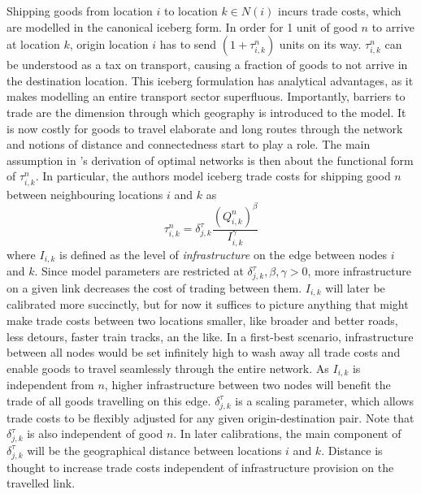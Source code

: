 \documentclass[11pt, oneside]{article}   	%
\begin{document}
Shipping goods from location $i$ to location $k \in N(i)$ incurs trade costs, which are modelled in the canonical iceberg form. In order for 1 unit of good $n$ to arrive at location $k$, origin location $i$ has to send $(1+\tau_{i,k}^{n})$ units on its way. $\tau_{i,k}^{n}$ can be understood as a tax on transport, causing a fraction of goods to not arrive in the destination location. This iceberg formulation has analytical advantages, as it makes modelling an entire transport sector superfluous. Importantly, barriers to trade are the dimension through which geography is introduced to the model. It is now costly for goods to travel elaborate and long routes through the network and notions of distance and connectedness start to play a role. The main assumption in \citeauthor{fajgelbaum_optimal_2017}'s derivation of optimal networks is then about the functional form of $\tau_{i,k}^{n}$. In particular, the authors model iceberg trade costs for shipping good $n$ between neighbouring locations $i$ and $k$ as
\begin{equation}
  \tau_{i,k}^{n} = \delta^{\tau}_{j, k} \frac{(Q_{i,k}^{n})^{\beta}}{I_{i,k}^{\gamma}}
  \label{eq:tau}
\end{equation}
where $I_{i,k}$ is defined as the level of \emph{infrastructure} on the edge between nodes $i$ and $k$. Since model parameters are restricted at $\delta^{\tau}_{j, k}, \beta, \gamma >0$, more infrastructure on a given link decreases the cost of trading between them. $I_{i,k}$ will later be calibrated more succinctly, but for now it suffices to picture anything that might make trade costs between two locations smaller, like broader and better roads, less detours, faster train tracks, an the like. In a first-best scenario, infrastructure between all nodes would be set infinitely high to wash away all trade costs and enable goods to travel seamlessly through the entire network. As $I_{i,k}$ is independent from $n$, higher infrastructure between two nodes will benefit the trade of all goods travelling on this edge. $\delta^{\tau}_{j, k}$ is a scaling parameter, which allows trade costs to be flexibly adjusted for any given origin-destination pair. Note that $\delta^{\tau}_{j, k}$ is also  independent of good $n$. In later calibrations, the main component of $\delta^{\tau}_{j, k}$ will be the geographical distance between locations $i$ and $k$. Distance is thought to increase trade costs independent of infrastructure provision on the travelled link.
\end{document}
